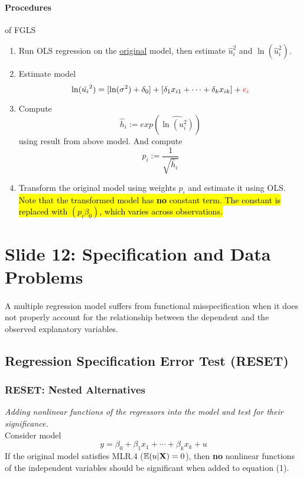 \documentclass[]{article}
\begin{document}
			\paragraph{Procedures} of FGLS
				\begin{enumerate}
					\item Run OLS regression on the \ul{original} model, then estimate $\hat{u}_i^2$ and $\ln(\hat{u}_i^2)$.
					\item Estimate model 
						\[
							\ln(\hat{u_i}^2) = [\ln(\sigma^2) + \delta_0] + [\delta_1 x_{i1} + \dots + \delta_k x_{ik}] + \textcolor{red}{e_i}
						\]
					\item Compute 
						\[
							\hat{h}_i := exp(\widehat{\ln(u_i^2)})
						\]
					using result from above model. And compute 
					\[
						p_i := \frac{1}{\sqrt{\hat{h}_i}}
					\]
					\item Transform the original model using weights $p_i$ and estimate it using OLS. \hl{Note that the transformed model has \textbf{no} constant term. The constant is replaced with $(p_i \beta_0)$, which varies across observations.}
				\end{enumerate}
	\section{Slide 12: Specification and Data Problems}
		\paragraph{} A multiple regression model suffers from functional misspecification when it does not properly account for the relationship between the dependent and the observed explanatory variables.
		\subsection{Regression Specification Error Test (RESET)}
		\subsubsection{RESET: Nested Alternatives}
			\par \emph{Adding nonlinear functions of the regressors into the model and test for their significance.}
			\\
			Consider model 
			\begin{equation}
				y = \beta_0 + \beta_1 x_1 + \cdots + \beta_k x_k + u
			\end{equation}
			If the original model satisfies MLR.4 ($\mathbb{E}({u|\textbf{X}})=0$), then \textbf{no} nonlinear functions of the independent variables should be significant when added to equation (1). 
			
\end{document}

